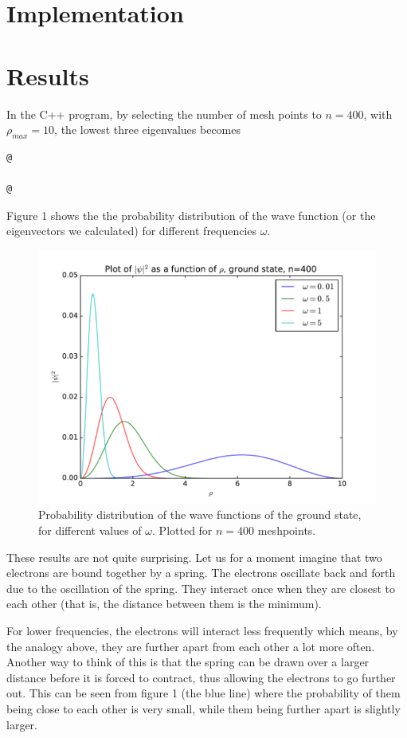 \documentclass[12pt]{article}
\begin{document}
\section{Implementation}

\section{Results}
In the C++ program, by selecting the number of mesh points to $n=400$, with $\rho_{max} = 10$, the lowest three eigenvalues becomes
\begin{lstlisting}
@

@
\end{lstlisting}
Figure 1 shows the the probability distribution of the wave function (or the eigenvectors we calculated) for different frequencies $\omega$. 
\begin{figure}[hbtp]
\centering
\includegraphics[width=\linewidth]{Plots/Plot_groundstate_n400.pdf}
\caption{Probability distribution of the wave functions of the ground state, for different values of $\omega$. Plotted for $n=400$ meshpoints.}
\end{figure}
These results are not quite surprising. Let us for a moment imagine that two electrons are bound together by a spring. The electrons oscillate back and forth due to the oscillation of the spring. They interact once when they are closest to each other (that is, the distance between them is the minimum).

For lower frequencies, the electrons will interact less frequently which means, by the analogy above, they are further apart from each other a lot more often. Another way to think of this is that the spring can be drawn over a larger distance before it is forced to contract, thus allowing the electrons to go further out. This can be seen from figure 1 (the blue line) where the probability of them being close to each other is very small, while them being further apart is slightly larger.
\end{document}
